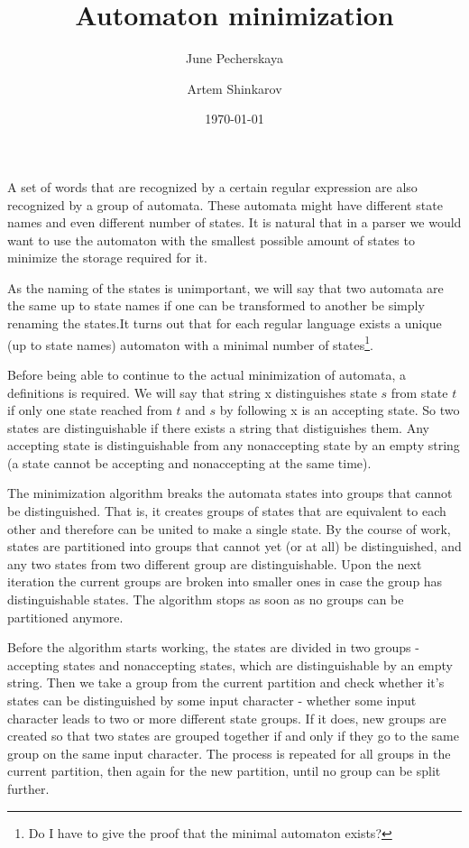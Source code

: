 \documentclass{article}
\author{June Pecherskaya \and Artem Shinkarov}
\date{\today}
\title{Automaton minimization}
\begin{document}
\maketitle


A set of words that are recognized by a certain regular expression are
also recognized by a group of automata. These automata might have
different state names and even different number of states. It is
natural that in a parser we would want to use the automaton with the
smallest possible amount of states to minimize the storage required
for it.

As the naming of the states is unimportant, we will say that two
automata are the same up to state names if one can be transformed to
another be simply renaming the states.It turns out that for each
regular language exists a unique (up to state names) automaton with a
minimal number of states\footnote{Do I have to give the proof that the
minimal automaton exists?}.

Before being able to continue to the actual minimization of automata,
a definitions is required. We will say that string x distinguishes
state $s$ from state $t$ if only one state reached from $t$ and $s$ by
following x is an accepting state. So two states are distinguishable
if there exists a string that distiguishes them. Any accepting state
is distinguishable from any nonaccepting state by an empty string (a
state cannot be accepting and nonaccepting at the same time).

The minimization algorithm breaks the automata states into groups that
cannot be distinguished. That is, it creates groups of states that are
equivalent to each other and therefore can be united to make a single
state. By the course of work, states are partitioned into groups that
cannot yet (or at all) be distinguished, and any two states from two
different group are distinguishable. Upon the next iteration the
current groups are broken into smaller ones in case the group has
distinguishable states. The algorithm stops as soon as no groups can
be partitioned anymore.

Before the algorithm starts working, the states are divided in two
groups - accepting states and nonaccepting states, which are
distinguishable by an empty string. Then we take a group from the
current partition and check whether it’s states can be distinguished
by some input character - whether some input character leads to two or
more different state groups. If it does, new groups are created so
that two states are grouped together if and only if they go to the
same group on the same input character. The process is repeated for
all groups in the current partition, then again for the new partition,
until no group can be split further.   
\end{document}
